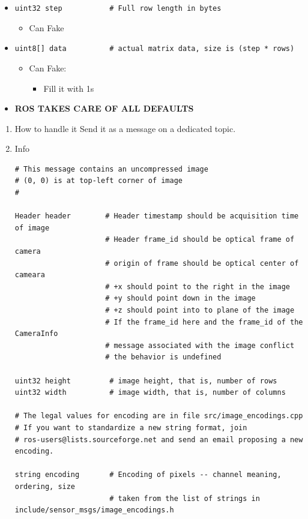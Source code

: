 \documentclass{article}
\begin{document}
\begin{enumerate}
\begin{enumerate}
\begin{itemize}
\item \verb~uint32 step           # Full row length in bytes~
\begin{itemize}
\item Can Fake
\end{itemize}
\item \verb~uint8[] data          # actual matrix data, size is (step * rows)~
\begin{itemize}
\item Can Fake:
\begin{itemize}
\item Fill it with 1s
\end{itemize}
\end{itemize}
\item \textbf{ROS TAKES CARE OF ALL DEFAULTS}
\end{itemize}
\begin{enumerate}
\item How to handle it
\label{sec-1-4-3-1-1}
Send it as a message on a dedicated topic.
\item Info
\label{sec-1-4-3-1-2}
\begin{verbatim}
# This message contains an uncompressed image
# (0, 0) is at top-left corner of image
#

Header header        # Header timestamp should be acquisition time of image
                     # Header frame_id should be optical frame of camera
                     # origin of frame should be optical center of cameara
                     # +x should point to the right in the image
                     # +y should point down in the image
                     # +z should point into to plane of the image
                     # If the frame_id here and the frame_id of the CameraInfo
                     # message associated with the image conflict
                     # the behavior is undefined

uint32 height         # image height, that is, number of rows
uint32 width          # image width, that is, number of columns

# The legal values for encoding are in file src/image_encodings.cpp
# If you want to standardize a new string format, join
# ros-users@lists.sourceforge.net and send an email proposing a new encoding.

string encoding       # Encoding of pixels -- channel meaning, ordering, size
                      # taken from the list of strings in include/sensor_msgs/image_encodings.h


\end{verbatim}
\end{enumerate}
\end{enumerate}
\end{enumerate}
\end{document}
